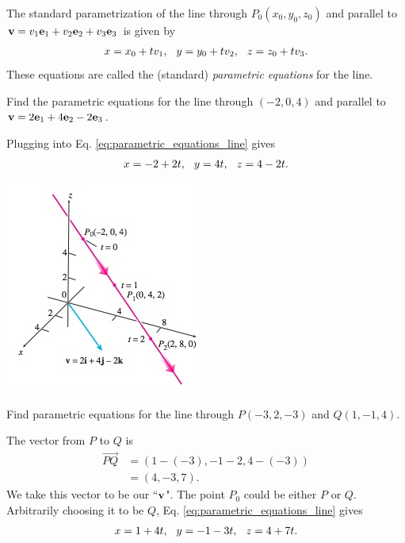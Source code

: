 \documentclass[12pt,letterpaper,reqno]{article}
\numberwithin{equation}{section}
\newcommand{\ti}[1]{\textit{#1}}
\begin{document}
\begin{defn}
	The standard parametrization of the line through $P_0(x_0,y_0,z_0)$ and parallel to ${\bf v}=v_1{\bf e}_1+v_2{\bf e}_2+v_3{\bf e}_3$ is given by
	\begin{align*}
		x=x_0+tv_1, \hspace{0.25cm} y=y_0+tv_2, \hspace{0.25cm} z=z_0+tv_3.
	\end{align*}
	These equations are called the (standard) \ti{parametric equations} for the line.
\end{defn}

\begin{exercise}
Find the parametric equations for the line through $(-2,0,4)$ and parallel to ${\bf v}=2{\bf e}_1+4{\bf e}_2-2{\bf e}_3$.	
\end{exercise}

{\color{red} 
Plugging into Eq. \eqref{eq:parametric_equations_line} gives
\begin{align*}
	x=-2+2t, \hspace{0.25cm} y=4t, \hspace{0.25cm} z=4-2t.
\end{align*}}
\begin{center}
	\includegraphics[scale=0.5]{figures_mvc/parametrized_line_example_1}
\end{center}

\begin{example}
	Find parametric equations for the line through $P(-3,2,-3)$ and $Q(1,-1,4)$.
\end{example}

{\color{red} 
The vector from $P$ to $Q$ is 
\begin{align*}
	\overrightarrow{PQ}&=(1-(-3), -1-2, 4-(-3)) \\
	&=(4,-3,7).
\end{align*}
We take this vector to be our ``${\bf v}$". The point $P_0$ could be either $P$ or $Q$. Arbitrarily choosing it to be $Q$, Eq. \eqref{eq:parametric_equations_line} gives
\begin{align*}
	x=1+4t, \hspace{0.25cm} y=-1-3t, \hspace{0.25cm} z=4+7t.
\end{align*}}
\end{document}
